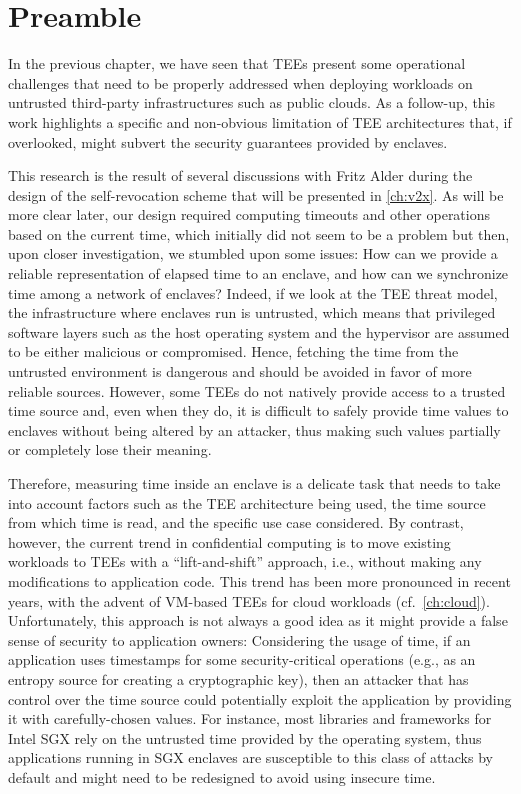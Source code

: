 \section*{Preamble}

In the previous chapter, we have seen that \acsp{TEE} present some operational
challenges that need to be properly addressed when deploying workloads on
untrusted third-party infrastructures such as public clouds. As a follow-up,
this work highlights a specific and non-obvious limitation of \acs{TEE}
architectures that, if overlooked, might subvert the security guarantees
provided by enclaves.

This research is the result of several discussions with Fritz Alder during the
design of the self-revocation scheme that will be presented in \cref{ch:v2x}. As
will be more clear later, our design required computing timeouts and other
operations based on the current time, which initially did not seem to be a
problem but then, upon closer investigation, we stumbled upon some issues: How
can we provide a reliable representation of elapsed time to an enclave, and how
can we synchronize time among a network of enclaves? Indeed, if we look at the
\acs{TEE} threat model, the infrastructure where enclaves run is untrusted,
which means that privileged software layers such as the host operating system
and the hypervisor are assumed to be either malicious or compromised. Hence,
fetching the time from the untrusted environment is dangerous and should be
avoided in favor of more reliable sources. However, some \acsp{TEE} do not
natively provide access to a trusted time source and, even when they do, it is
difficult to safely provide time values to enclaves without being altered by an
attacker, thus making such values partially or completely lose their meaning.

Therefore, measuring time inside an enclave is a delicate task that needs to
take into account factors such as the \acs{TEE} architecture being used, the
time source from which time is read, and the specific use case considered. By
contrast, however, the current trend in confidential computing is to move
existing workloads to \acsp{TEE} with a ``lift-and-shift'' approach, i.e.,
without making any modifications to application code. This trend has been more
pronounced in recent years, with the advent of \acs{VM}-based \acsp{TEE} for
cloud workloads (cf.~\cref{ch:cloud}). Unfortunately, this approach is not
always a good idea as it might provide a false sense of security to application
owners: Considering the usage of time, if an application uses timestamps for
some security-critical operations (e.g., as an entropy source for creating a
cryptographic key), then an attacker that has control over the time source could
potentially exploit the application by providing it with carefully-chosen
values. For instance, most libraries and frameworks for Intel \acs{SGX} rely on
the untrusted time provided by the operating system, thus applications running
in \acs{SGX} enclaves are susceptible to this class of attacks by default and
might need to be redesigned to avoid using insecure time.


